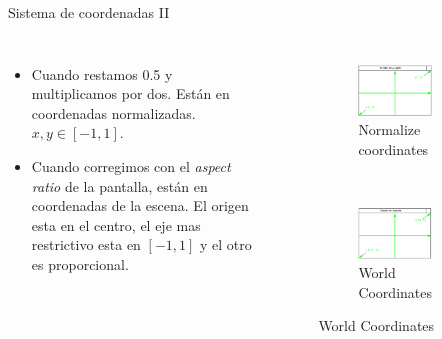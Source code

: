 \begin{frame}{Sistema de coordenadas II}
\begin{columns}
    \begin{itemize}
        \item Cuando restamos 0.5 y multiplicamos por dos. Están en coordenadas normalizadas. $x,y \in [-1, 1]$.
        \item Cuando corregimos con el \emph{aspect ratio} de la pantalla, están en coordenadas de la escena. El origen esta en el centro, el eje mas restrictivo esta en $[-1, 1]$ y el otro es proporcional.
     \end{itemize}
\begin{figure}[htp]
 \centering
 \begin{subfigure}[b]{0.45\textwidth}
   \includegraphics[width=\textwidth]{img/FoRNormalized}
   \caption{Normalize coordinates}
 \end{subfigure}
\\
 \begin{subfigure}[b]{0.45\textwidth}
   \includegraphics[width=\textwidth]{img/FoRCorrected}
   \caption{World Coordinates}
 \end{subfigure}
\end{figure}
\end{columns}
\end{frame}

